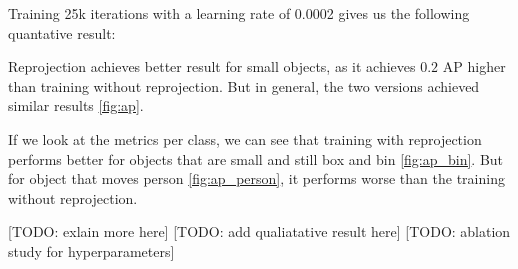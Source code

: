 Training 25k iterations with a learning rate of 0.0002 gives us the following quantative result:


Reprojection achieves better result for small objects, as it achieves $0.2$ AP higher than training without reprojection. But in general, the two versions achieved similar results \ref{fig:ap}. 

If we look at the metrics per class, we can see that training with reprojection performs better for objects that are small and still \eg box and bin \ref{fig:ap_bin}. But for object that moves \eg person \ref{fig:ap_person}, it performs worse than the training without reprojection. 

[TODO: exlain more here]
[TODO: add qualiatative result here]
[TODO: ablation study for hyperparameters]

 